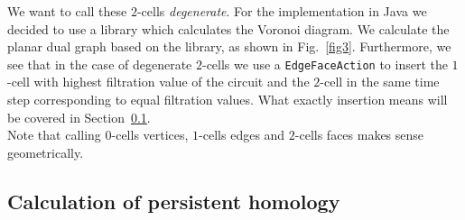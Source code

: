 \documentclass[11pt, a4paper, UKenglish]{article}
\begin{document}
    We want to call these $2$-cells \textit{degenerate}.
    For the implementation in Java we decided to use a library which calculates the Voronoi diagram.
    We calculate the planar dual graph based on the library, as shown in Fig.~\ref{fig3}.
    Furthermore, we see that in the case of degenerate $2$-cells we use a \texttt{EdgeFaceAction} to insert the $1$-cell with highest filtration value of the circuit and the $2$-cell in the same time step corresponding to equal filtration values.
    What exactly insertion means will be covered in Section~\ref{subsec:calculation-of-persistent-homology}.\\
    Note that calling $0$-cells vertices, $1$-cells edges and $2$-cells faces makes sense geometrically.

    \subsection{Calculation of persistent homology}\label{subsec:calculation-of-persistent-homology}
\end{document}
